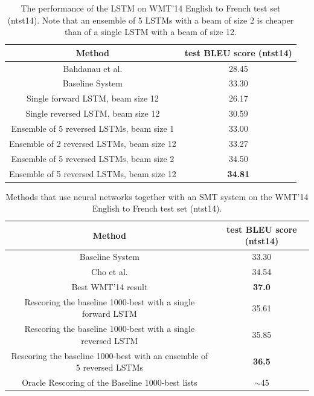 \begin{table}[t]
\centering
\begin{small}
\begin{tabular}{|c|c|}
\hline
{\bf Method}  & {\bf test BLEU score (ntst14) } \\ \hline
Bahdanau et al. \cite{bog14}  &  28.45 \\ \hline
Baseline System  \cite{wmt14_en_fr} & 33.30 \\ \hline
\hline
Single forward LSTM, beam size 12 & 26.17 \\ \hline                 
Single reversed LSTM, beam size 12 & 30.59 \\ \hline
Ensemble of 5 reversed LSTMs, beam size 1  &  33.00 \\ \hline
Ensemble of 2 reversed LSTMs, beam size 12  &  33.27 \\ \hline
Ensemble of 5 reversed LSTMs, beam size 2  &  34.50 \\ \hline
Ensemble of 5 reversed LSTMs, beam size 12  &  {\bf 34.81} \\ \hline
\end{tabular}
\end{small}
\caption{The performance of the LSTM on WMT'14 English to French test
  set (ntst14).  Note that an ensemble of 5 LSTMs with a beam of size
  2 is cheaper than of a single LSTM with a beam of size 12.  }
\label{tab:blue_fr}
\end{table}

\begin{table}[]
\centering
\begin{small}
\begin{tabular}{|c|c|}
\hline
{\bf Method}  & {\bf test BLEU score (ntst14) } \\ \hline
Baseline System  \cite{wmt14_en_fr} & 33.30 \\ \hline
Cho et al. \cite{cho14}  & 34.54 \\ \hline 
Best WMT'14 result \cite{durrani-EtAl:2014:W14-33} &  {\bf 37.0} \\ \hline
\hline
Rescoring the baseline 1000-best with a single forward LSTM & 35.61 \\ \hline 
Rescoring the baseline 1000-best with a single reversed  LSTM & 35.85 \\ \hline  %
Rescoring the baseline 1000-best with an ensemble of 5 reversed LSTMs  &  {\bf 36.5} \\ \hline    %
\hline
Oracle Rescoring of the Baseline 1000-best lists    & $\sim$45 \\ \hline 
\end{tabular}
\end{small}
\caption{Methods that use neural networks together with an SMT system
  on the WMT'14 English to French test set (ntst14).}
\label{tab:blue_fr_rescore}
\end{table}




